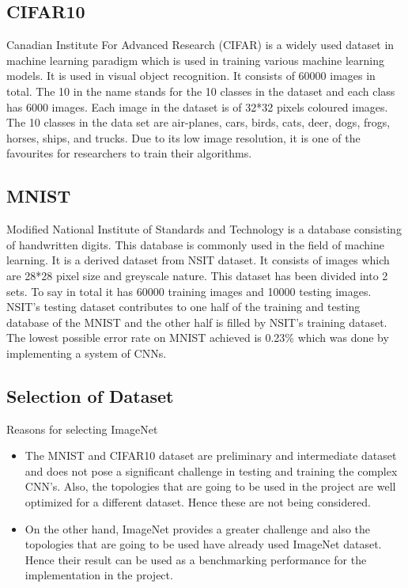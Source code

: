 \documentclass[titlepage]{report}
\begin{document}
\subsection{CIFAR10}
Canadian Institute For Advanced Research (CIFAR) is a widely used dataset in machine learning paradigm which is used in training various machine learning models. It is used in visual object recognition. It consists of 60000 images in total. The 10 in the name stands for the 10 classes in the dataset and each class has 6000 images. Each image in the dataset is of 32*32 pixels coloured images. The 10 classes in the data set are air-planes, cars, birds, cats, deer, dogs, frogs, horses, ships, and trucks.  Due to its low image resolution, it is one of the favourites for researchers to train their algorithms. 

\subsection{MNIST}
Modified National Institute of Standards and Technology is a database consisting of handwritten digits. This database is commonly used in the field of machine learning. It is a derived dataset from NSIT dataset. It consists of images which are 28*28 pixel size and greyscale nature. This dataset has been divided into 2 sets. To say in total it has 60000 training images and 10000 testing images. NSIT's testing dataset contributes to one half of the training and testing database of the MNIST and the other half is filled by NSIT's training dataset. The lowest possible error rate on MNIST achieved is 0.23\%
which was done by implementing a system of CNNs.

\subsection{Selection of Dataset}
Reasons for selecting ImageNet
\begin{itemize}
    \item The MNIST and CIFAR10 dataset are preliminary and intermediate dataset and does not pose a significant challenge in testing and training the complex CNN’s. Also, the topologies that are going to be used in the project are well optimized for a different dataset. Hence these are not being considered.
    \item On the other hand, ImageNet provides a greater challenge and also the topologies that are going to be used have already used ImageNet dataset. Hence their result can be used as a benchmarking performance for the implementation in the project.
\end{itemize}
\end{document}
